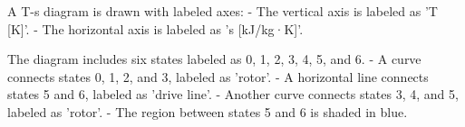 A T-s diagram is drawn with labeled axes:  
- The vertical axis is labeled as 'T [K]'.  
- The horizontal axis is labeled as 's [kJ/kg·K]'.  

The diagram includes six states labeled as 0, 1, 2, 3, 4, 5, and 6.  
- A curve connects states 0, 1, 2, and 3, labeled as 'rotor'.  
- A horizontal line connects states 5 and 6, labeled as 'drive line'.  
- Another curve connects states 3, 4, and 5, labeled as 'rotor'.  
- The region between states 5 and 6 is shaded in blue.